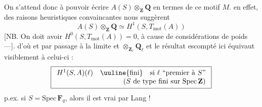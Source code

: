 On s'attend donc à pouvoir écrire $A(S)\otimes_{\mathbf{Z}}\mathbf{Q}$ en termes de ce motif $M$.
 en effet, des raisons heuristiques convaincantes  nous suggèrent
\[
A(S)\otimes_{\mathbf{Z}}\mathbf{Q}\simeq H^1(S,T_{\mathrm{mot}}(A))
\]
[NB. On doit avoir $H^0(S,T_{\mathrm{mot}}(A))=0$, à cause de  considérations de poids ---].
  
d'où
et par passage à la limite et $\otimes_{\mathbf{Z}_\ell}\mathbf{Q}_\ell$
et le résultat escompté ici équivaut visiblement à celui-ci :
\[
\boxed{\begin{array}{l}
H^1(S,A)(\ell)\quad\uuline{\text{fini}}\quad\text{si }\ell\text{ ``premier à }S\text{''}\\
\hfill(S\text{ de type fini sur }\mathrm{Spec}\,\mathbf{Z})
\end{array}}
\]
p.ex. si $S=\mathrm{Spec}\,\mathbf{F}_q$, alors il est vrai par Lang !

